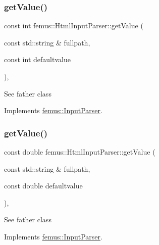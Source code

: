 \subsubsection{\texorpdfstring{get\+Value()}{getValue()}\hspace{0.1cm}{\footnotesize\ttfamily [1/6]}}
{\footnotesize\ttfamily const int femus\+::\+Html\+Input\+Parser\+::get\+Value (\begin{DoxyParamCaption}\item[{const std\+::string \&}]{fullpath,  }\item[{const int}]{defaultvalue }\end{DoxyParamCaption})\hspace{0.3cm}{\ttfamily [inline]}, {\ttfamily [virtual]}}

See father class 

Implements \mbox{\hyperlink{classfemus_1_1_input_parser_ae178b5210e0a7df40b7eb78133cac13c}{femus\+::\+Input\+Parser}}.

\mbox{\label{classfemus_1_1_html_input_parser_aec006b4a50b3e9d7805483672015b140}} 
\subsubsection{\texorpdfstring{get\+Value()}{getValue()}\hspace{0.1cm}{\footnotesize\ttfamily [2/6]}}
{\footnotesize\ttfamily const double femus\+::\+Html\+Input\+Parser\+::get\+Value (\begin{DoxyParamCaption}\item[{const std\+::string \&}]{fullpath,  }\item[{const double}]{defaultvalue }\end{DoxyParamCaption})\hspace{0.3cm}{\ttfamily [inline]}, {\ttfamily [virtual]}}

See father class 

Implements \mbox{\hyperlink{classfemus_1_1_input_parser_ab7ff8e8528d6f9e7cc6f928f7020687e}{femus\+::\+Input\+Parser}}.

\mbox{\label{classfemus_1_1_html_input_parser_a64208f42950a39ffe4bdf458af9e2c67}} 
